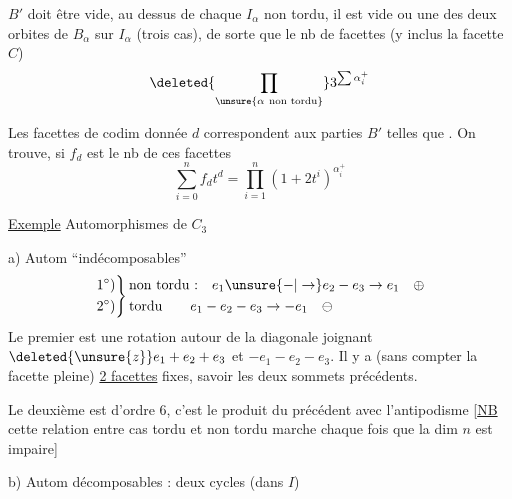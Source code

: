 $B'$ doit être vide, au dessus de chaque $I_\alpha$ non tordu, il est  vide ou une des deux orbites de $B_\alpha$ sur $I_\alpha$ (trois cas), de sorte que le nb de  facettes  (y inclus la facette $C$)
\[
\deleted{\prod_{\unsure{\alpha\ \text{non tordu}}}}3^{\sum\alpha_i^+}
\]

Les facettes de codim donnée $d$ correspondent aux parties $B'$ telles que   . On trouve, si $f_d$ est le nb de ces facettes
\[
\boxed{\sum_{i=0}^n f_d t^d=\prod_{i=1}^n(1+2t^i)^{\alpha_i^+}}
\]

\uline{Exemple} Automorphismes de $C_3$

a) Autom ``indécomposables''
\[
\left.
\begin{aligned}
1^\circ)\\2^\circ)
\end{aligned}
\right\}
\begin{aligned}
&\text{non tordu :}\quad e_1\unsure{-|\to}e_2-e_3\to e_1\quad\oplus\\
&\text{tordu}\qquad e_1-e_2-e_3\to -e_1\quad\ominus
\end{aligned}
\]
Le premier est une rotation  autour de la diagonale joignant $\deleted{\unsure{z}}e_1+e_2+e_3$ et $-e_1-e_2-e_3$. Il y a (sans compter la facette pleine) \uline{2 facettes} fixes, savoir les deux sommets précédents.

Le deuxième est d'ordre 6,  c'est  le produit du précédent avec l'antipodisme [\uline{NB} cette relation entre cas tordu et non tordu marche chaque fois que la dim $n$ est impaire]

b) Autom décomposables : deux cycles (dans $I$)

